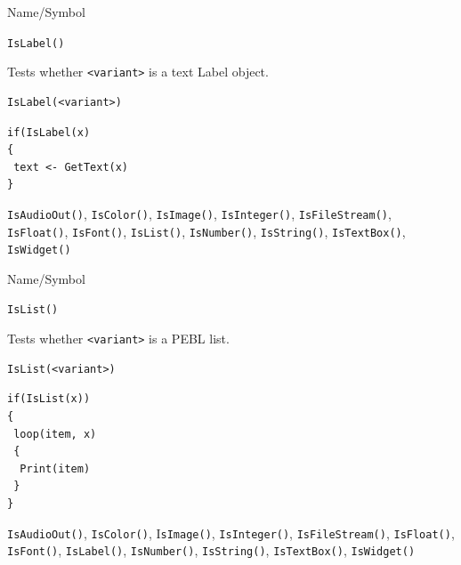 \begin{desc}{Name/Symbol}
\item[Name/Symbol]	\verb+IsLabel()+

\item[Description]	Tests whether \verb+<variant>+ is a text Label object.

\item[Usage]		
\begin{verbatim}
IsLabel(<variant>)
\end{verbatim}

\item[Example]	
\begin{verbatim}
if(IsLabel(x)
{
 text <- GetText(x)
}
\end{verbatim}

\item[See Also] \verb+IsAudioOut()+, \verb+IsColor()+,
  \verb+IsImage()+, \verb+IsInteger()+, \verb+IsFileStream()+,
  \verb+IsFloat()+, \verb+IsFont()+, \verb+IsList()+,
  \verb+IsNumber()+, \verb+IsString()+, \verb+IsTextBox()+,
  \verb+IsWidget()+
\end{desc}

\begin{desc}{Name/Symbol}
\item[Name/Symbol]	\verb+IsList()+

\item[Description]	Tests whether \verb+<variant>+ is a PEBL list.

\item[Usage]
\begin{verbatim}
IsList(<variant>)
\end{verbatim}

\item[Example]	
\begin{verbatim}
if(IsList(x))
{
 loop(item, x)
 {
  Print(item)
 }
}
\end{verbatim}

\item[See Also] \verb+IsAudioOut()+, \verb+IsColor()+,
  I\verb+sImage()+, \verb+IsInteger()+, \verb+IsFileStream()+,
  \verb+IsFloat()+, \verb+IsFont()+, \verb+IsLabel()+,
  \verb+IsNumber()+, \verb+IsString()+, \verb+IsTextBox()+,
  \verb+IsWidget()+
\end{desc}

